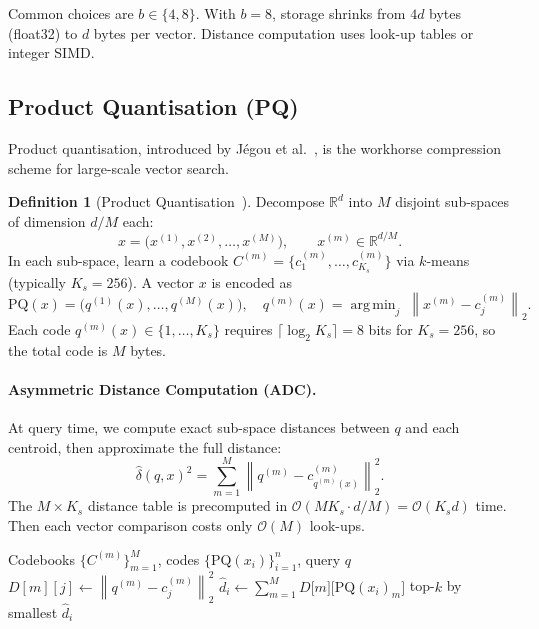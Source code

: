 \documentclass[11pt,a4paper]{article}
\theoremstyle{definition}
\newtheorem{definition}{Definition}[section]
\newcommand{\R}{\mathbb{R}}
\newcommand{\calO}{\mathcal{O}}
\newcommand{\norm}[1]{\left\lVert #1 \right\rVert}
\newcommand{\argmin}{\operatorname{arg\,min}}
\begin{document}
Common choices are $b \in \{4, 8\}$.  With $b=8$, storage shrinks from
$4d$ bytes (float32) to $d$ bytes per vector.  Distance computation uses
look-up tables or integer SIMD.

\subsection{Product Quantisation (PQ)}\label{subsec:pq}

Product quantisation, introduced by J\'egou et al.~\cite{jegou2011pq}, is the
workhorse compression scheme for large-scale vector search.

\begin{definition}[Product Quantisation~\cite{jegou2011pq}]
Decompose $\R^d$ into $M$ disjoint sub-spaces of dimension $d/M$ each:
\[
  x = \bigl(x^{(1)}, x^{(2)}, \ldots, x^{(M)}\bigr), \qquad
  x^{(m)} \in \R^{d/M}.
\]
In each sub-space, learn a codebook $C^{(m)} = \{c^{(m)}_1, \ldots,
c^{(m)}_{K_s}\}$ via $k$-means (typically $K_s = 256$).  A vector $x$
is encoded as
\[
  \mathrm{PQ}(x) = \bigl(q^{(1)}(x), \ldots, q^{(M)}(x)\bigr),
  \quad q^{(m)}(x) = \argmin_{j}\; \norm{x^{(m)} - c^{(m)}_j}_2.
\]
Each code $q^{(m)}(x) \in \{1,\ldots,K_s\}$ requires $\lceil\log_2
K_s\rceil = 8$ bits for $K_s=256$, so the total code is $M$ bytes.
\end{definition}

\paragraph{Asymmetric Distance Computation (ADC).}
At query time, we compute exact sub-space distances between $q$ and each
centroid, then approximate the full distance:
\[
  \hat{\delta}(q, x)^2 = \sum_{m=1}^{M}
  \norm{q^{(m)} - c^{(m)}_{q^{(m)}(x)}}_2^2.
\]
The $M \times K_s$ distance table is precomputed in $\calO(MK_s \cdot
d/M) = \calO(K_s d)$ time.  Then each vector comparison costs only
$\calO(M)$ look-ups.

\begin{algorithm}[H]
\caption{PQ Search with ADC}
\begin{algorithmic}[1]
\Require Codebooks $\{C^{(m)}\}_{m=1}^M$, codes $\{\mathrm{PQ}(x_i)\}_{i=1}^n$, query $q$
 
    \State $D[m][j] \gets \norm{q^{(m)} - c^{(m)}_j}_2^2$
  \EndFor
\EndFor
{} 
  \State $\hat{d}_i \gets \sum_{m=1}^M D\bigl[m\bigr]\bigl[\mathrm{PQ}(x_i)_m\bigr]$
\EndFor
\State \Return top-$k$ by smallest $\hat{d}_i$
\end{algorithmic}
\end{algorithm}
\end{document}
